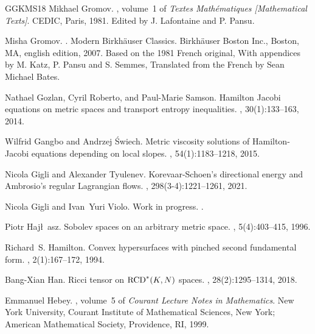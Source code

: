 \documentclass[11pt]{article}
\numberwithin{equation}{section}
\begin{document}
{\begin{thebibliography}{GGKMS18}
Mikhael Gromov.
, volume~1 of {\em Textes Math\'{e}matiques [Mathematical
  Texts]}.
\newblock CEDIC, Paris, 1981.
\newblock Edited by J. Lafontaine and P. Pansu.

Misha Gromov.
.
\newblock Modern Birkh\"auser Classics. Birkh\"auser Boston Inc., Boston, MA,
  english edition, 2007.
\newblock Based on the 1981 French original, With appendices by M. Katz, P.
  Pansu and S. Semmes, Translated from the French by Sean Michael Bates.

Nathael Gozlan, Cyril Roberto, and Paul-Marie Samson.
\newblock Hamilton {J}acobi equations on metric spaces and transport entropy
  inequalities.
, 30(1):133--163, 2014.

Wilfrid Gangbo and Andrzej {\'S}wiech.
\newblock Metric viscosity solutions of {H}amilton-{J}acobi equations depending
  on local slopes.
, 54(1):1183--1218,
  2015.

Nicola Gigli and Alexander Tyulenev.
\newblock Korevaar-{S}choen's directional energy and {A}mbrosio's regular
  {L}agrangian flows.
, 298(3-4):1221--1261, 2021.

Nicola Gigli and Ivan~Yuri Violo.
\newblock Work in progress.
.

Piotr Haj\l~asz.
\newblock Sobolev spaces on an arbitrary metric space.
, 5(4):403--415, 1996.

Richard~S. Hamilton.
\newblock Convex hypersurfaces with pinched second fundamental form.
, 2(1):167--172, 1994.

Bang-Xian Han.
\newblock Ricci tensor on {${\rm RCD}^*(K,N)$} {spaces}.
, 28(2):1295--1314, 2018.

Emmanuel Hebey.
, volume~5 of {\em Courant Lecture Notes in Mathematics}.
\newblock New York University, Courant Institute of Mathematical Sciences, New
  York; American Mathematical Society, Providence, RI, 1999.


\end{thebibliography}}
\end{document}
